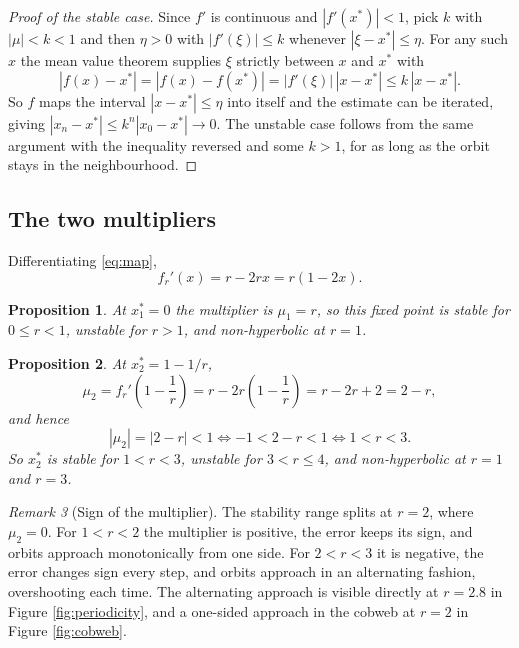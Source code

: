 \documentclass[11pt,a4paper]{article}
\newtheorem{proposition}{Proposition}[section]
\theoremstyle{definition}
\theoremstyle{remark}
\newtheorem{remark}[proposition]{Remark}
\newcommand{\logmap}{f_r}
\begin{document}
\begin{proof}[Proof of the stable case]
Since $f'$ is continuous and $|f'(x^{*})|<1$, pick $k$ with $|\mu|<k<1$ and
then $\eta>0$ with $|f'(\xi)|\le k$ whenever $|\xi-x^{*}|\le\eta$. For any
such $x$ the mean value theorem supplies $\xi$ strictly between $x$ and
$x^{*}$ with
\begin{equation}
  |f(x)-x^{*}| = |f(x)-f(x^{*})| = |f'(\xi)|\,|x-x^{*}| \le k\,|x-x^{*}| .
\end{equation}
So $f$ maps the interval $|x-x^{*}|\le\eta$ into itself and the estimate can
be iterated, giving $|x_n-x^{*}|\le k^{n}|x_0-x^{*}|\to0$. The unstable case
follows from the same argument with the inequality reversed and some $k>1$,
for as long as the orbit stays in the neighbourhood.
\end{proof}

\subsection{The two multipliers}

Differentiating \eqref{eq:map},
\begin{equation}
  \logmap'(x) = r-2rx = r(1-2x) .
  \label{eq:derivative}
\end{equation}

\begin{proposition}
\label{prop:stab1}
At $x_1^{*}=0$ the multiplier is $\mu_1=r$, so this fixed point is stable for
$0\le r<1$, unstable for $r>1$, and non-hyperbolic at $r=1$.
\end{proposition}

\begin{proposition}
\label{prop:stab2}
At $x_2^{*}=1-1/r$,
\begin{equation}
  \mu_2 = \logmap'\!\left(1-\frac{1}{r}\right)
        = r-2r\left(1-\frac{1}{r}\right)
        = r-2r+2 = 2-r ,
  \label{eq:mu2}
\end{equation}
and hence
\begin{equation}
  |\mu_2| = |2-r| < 1 \iff -1 < 2-r < 1 \iff 1 < r < 3 .
  \label{eq:stabrange}
\end{equation}
So $x_2^{*}$ is stable for $1<r<3$, unstable for $3<r\le4$, and
non-hyperbolic at $r=1$ and $r=3$.
\end{proposition}

\begin{remark}[Sign of the multiplier]
\label{rem:sign}
The stability range splits at $r=2$, where $\mu_2=0$. For $1<r<2$ the
multiplier is positive, the error keeps its sign, and orbits approach
monotonically from one side. For $2<r<3$ it is negative, the error changes
sign every step, and orbits approach in an alternating fashion, overshooting
each time. The alternating approach is visible directly at $r=2.8$ in Figure
\ref{fig:periodicity}, and a one-sided approach in the cobweb at $r=2$ in
Figure \ref{fig:cobweb}.
\end{remark}
\end{document}
